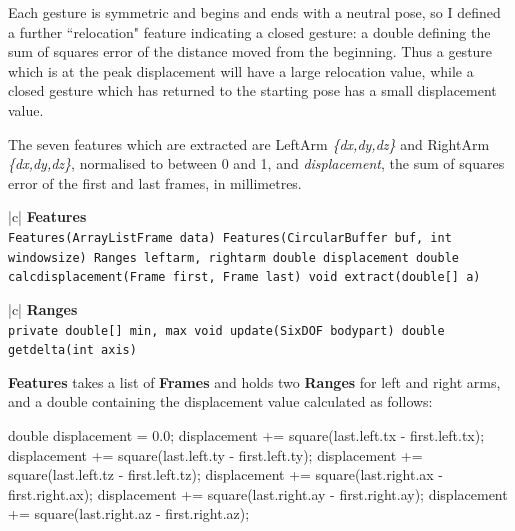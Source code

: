 \documentclass[12pt,a4,notitlepage]{report}
\renewcommand{\_}{\texttt{\symbol{95}}}
\newcommand{\<}{\texttt{\symbol{60}}}
\renewcommand{\>}{\texttt{\symbol{62}}}
\newcommand{\class}[1]{\textbf{#1}}
\newcommand{\variable}[1]{\texttt{#1}}
\begin{document}
Each gesture is symmetric and begins and ends with a neutral pose, so I defined a further ``relocation" feature indicating a closed gesture: a double defining the sum of squares error of the distance moved from the beginning. Thus a gesture which is at the peak displacement will have a large relocation value, while a closed gesture which has returned to the starting pose has a small displacement value.

The seven features which are extracted are LeftArm {\em\{dx,dy,dz\}} and RightArm {\em\{dx,dy,dz\}}, normalised to between 0 and 1, and {\em displacement}, the sum of squares error of the first and last frames, in millimetres.

\begin{tabular}{|c|} \hline 
\class{Features} \\ \hline
{}
{\variable{Features(ArrayList\<Frame\> data) \newline
Features(CircularBuffer buf, int windowsize) \newline
Ranges leftarm, rightarm \newline
double displacement \newline
double calc\_displacement(Frame first, Frame last) \newline
void extract(double[] a)
} } \\ \hline
\end{tabular}

\begin{tabular}{|c|} \hline 
\class{Ranges} \\ \hline
{}
{\variable{private double[] min, max \newline
void update(SixDOF bodypart) \newline
double get\_delta(int axis)
} } \\ \hline
\end{tabular}

\class{Features} takes a list of \class{Frames} and holds two \class{Ranges} for left and right arms, and a double containing the displacement value calculated as follows:
\begin{code}
double displacement = 0.0;
displacement += square(last.left.tx - first.left.tx);
displacement += square(last.left.ty - first.left.ty);
displacement += square(last.left.tz - first.left.tz);
displacement += square(last.right.ax - first.right.ax);
displacement += square(last.right.ay - first.right.ay);
displacement += square(last.right.az - first.right.az);
\end{code}
\end{document}
